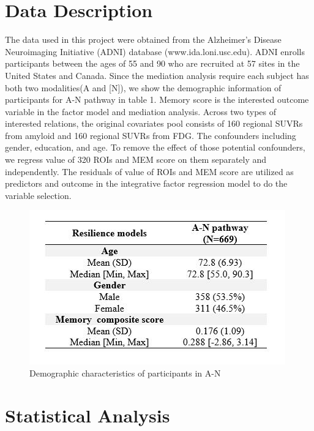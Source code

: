 \documentclass{article}
\begin{document}
 \section{Data Description}
The data used in this project were obtained from the Alzheimer's Disease Neuroimaging Initiative (ADNI) database (www.ida.loni.usc.edu). ADNI enrolls participants between the ages of 55 and 90 who are recruited at 57 sites in the United States and Canada. Since the mediation analysis require each subject has both two modalities(A and [N]), we show the demographic information of participants for A-N pathway in table 1. Memory score is the interested outcome variable in the factor model and mediation analysis. Across two types of interested relations, the original covariates pool consists of 160 regional SUVRs from amyloid and 160 regional SUVRs from FDG. The confounders including gender, education, and age. To remove the effect of those potential confounders, we regress value of 320 ROIs and MEM score on them separately and independently. The residuals of value of ROIs and MEM score are utilized as predictors and outcome in the integrative factor regression model to do the variable selection.
\begin{figure}[t]
         \centering
         \includegraphics[scale=0.52]{Table1.jpg}
         \caption{Demographic characteristics of participants in A-N}
\end{figure}
\section{Statistical Analysis}
\end{document}
